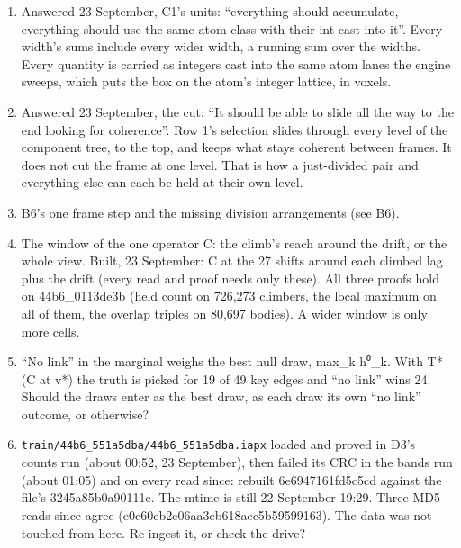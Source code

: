 \begin{enumerate}
\item Answered 23 September, C1's units: “everything should accumulate, everything should use the same atom class with their int cast into it”. Every width's sums include every wider width, a running sum over the widths. Every quantity is carried as integers cast into the same atom lanes the engine sweeps, which puts the box on the atom's integer lattice, in voxels.
\item Answered 23 September, the cut: “It should be able to slide all the way to the end looking for coherence”. Row 1's selection slides through every level of the component tree, to the top, and keeps what stays coherent between frames. It does not cut the frame at one level. That is how a just-divided pair and everything else can each be held at their own level.
\item B6's one frame step and the missing division arrangements (see B6).
\item The window of the one operator C: the climb's reach around the drift, or the whole view. Built, 23 September: C at the 27 shifts around each climbed lag plus the drift (every read and proof needs only these). All three proofs hold on 44b6\_\allowbreak{}0113de3b (held count on 726,273 climbers, the local maximum on all of them, the overlap triples on 80,697 bodies). A wider window is only more cells.
\item “No link” in the marginal weighs the best null draw, max\_\allowbreak{}k h⁰\_\allowbreak{}k. With T* (C at v*) the truth is picked for 19 of 49 key edges and “no link” wins 24. Should the draws enter as the best draw, as each draw its own “no link” outcome, or otherwise?
\item \texttt{train/\allowbreak{}44b6\_\allowbreak{}551a5dba/\allowbreak{}44b6\_\allowbreak{}551a5dba.\allowbreak{}iapx} loaded and proved in D3's counts run (about 00:52, 23 September), then failed its CRC in the bands run (about 01:05) and on every read since: rebuilt 6e6947161fd5c5cd against the file's 3245a85b0a90111e. The mtime is still 22 September 19:29. Three MD5 reads since agree (e0c60eb2e06aa3eb618aec5b59599163). The data was not touched from here. Re-ingest it, or check the drive?

\end{enumerate}
